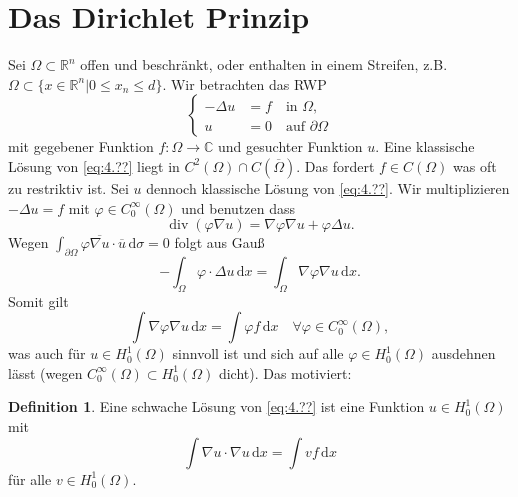 \documentclass[
paper=a4,
bibtotocnumbered,
liststotocnumbered,
tablecaptionabove,
pointlessnumbers,
twoside,
openright,
10pt
]
{report}
\let\phi\varphi
\theoremstyle{definition}
\newtheorem*{df}{Definition}
\numberwithin{equation}{chapter}
\begin{document}
\section{Das Dirichlet Prinzip}
Sei $\Omega \subset \mathbb R^n$ offen und beschränkt, oder enthalten in einem Streifen, z.B. $\Omega \subset \{ x\in \mathbb R^n| 0 \le x_n \le d\}$.  Wir betrachten das RWP
\begin{equation}\label{eq:4.??}
\begin{cases}
-\Delta u&= f \quad \text{in } \Omega,\\
u&=0 \quad \text{auf } \partial \Omega
\end{cases}
\end{equation}
mit gegebener Funktion $f: \Omega \to \mathbb C$ und gesuchter Funktion $u$. Eine klassische Lösung von \eqref{eq:4.??} liegt in $C^2(\Omega) \cap C(\overline{\Omega})$.
Das fordert $f\in C(\Omega)$ was oft zu restriktiv ist. Sei $u$ dennoch klassische Lösung von \eqref{eq:4.??}. 
Wir multiplizieren $-\Delta u=f$ mit $\phi \in C_0^\infty(\Omega)$ und benutzen dass
\begin{equation}
\operatorname{div}(\phi \nabla u) = \nabla \phi \nabla u + \phi \Delta u.
\end{equation}
Wegen $\int_{\partial\Omega} \phi \overline{\nabla u} \cdot \overline u \, \mathrm d\sigma =0$ folgt aus Gauß
\begin{equation}
-\int_\Omega \phi \cdot \Delta u \, \mathrm dx = \int_\Omega \nabla \phi \nabla u \, \mathrm dx.
\end{equation}
Somit gilt
\begin{equation}
\int \nabla \phi \nabla u \, \mathrm dx = \int \phi f \, \mathrm dx \quad \forall \phi \in C_0^\infty(\Omega),
\end{equation}
was auch für $u\in H_0^1(\Omega)$ sinnvoll ist und sich auf alle $\phi \in H_0^1(\Omega)$ ausdehnen lässt (wegen $C_0^\infty(\Omega)\subset H_0^1(\Omega)$ dicht).  Das motiviert:
\begin{df}
Eine schwache Lösung von \eqref{eq:4.??} ist eine Funktion $u\in H_0^1(\Omega)$ mit
\begin{equation}
\int \nabla u \cdot \nabla u \, \mathrm dx = \int v f\, \mathrm dx
\end{equation}
für alle $v\in H_0^1(\Omega)$.
\end{df}
\end{document}

